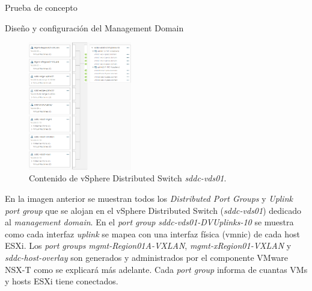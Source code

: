 \begin{section}{Prueba de concepto}
\begin{subsection}{Diseño y configuración del Management Domain}
\begin{itemize}
    \end{itemize}
    \begin{figure}[h]
      \centering
      \includegraphics[width=0.4\textwidth]{imaxes/pruebaconcepto/distributedSwitchEntornoFinal.png}
      \caption{Contenido de vSphere Distributed Switch \textit{sddc-vds01}.}
      \label{fig:port-groups-vSwitch-vSphere}
    \end{figure}
    \FloatBarrier
    En la imagen anterior se muestran todos los \textit{Distributed Port Groups} y \textit{Uplink port group} que se alojan en el vSphere Distributed Switch (\textit{sddc-vds01}) dedicado al \textit{management domain}. En el \textit{port group} \textit{sddc-vds01-DVUplinks-10} se muestra como cada interfaz \textit{uplink} se mapea con una interfaz física (vmnic) de cada host ESXi. Los \textit{port groups} \textit{mgmt-Region01A-VXLAN}, \textit{mgmt-xRegion01-VXLAN} y \textit{sddc-host-overlay} son generados y administrados por el componente VMware NSX-T como se explicará más adelante. Cada \textit{port group} informa de cuantas VMs y hosts ESXi tiene conectados.


\end{subsection}
\end{section}
